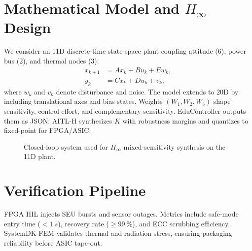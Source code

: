 \documentclass[conference]{IEEEtran}
\begin{document}
\section{Mathematical Model and \texorpdfstring{$H_\infty$}{H-infinity} Design}
We consider an 11D discrete-time state-space plant coupling attitude (6), power bus (2), and thermal nodes (3):
\begin{align}
  x_{k+1} &= A x_k + B u_k + E w_k, \label{eq:ss1}\\
  y_k     &= C x_k + D u_k + v_k, \label{eq:ss2}
\end{align}
where $w_k$ and $v_k$ denote disturbance and noise. The model extends to 20D by including translational axes and bias states.
Weights $(W_1,W_2,W_3)$ shape sensitivity, control effort, and complementary sensitivity. EduController outputs them as JSON; AITL-H synthesizes $K$ with robustness margins and quantizes to fixed-point for FPGA/ASIC.

\begin{figure}[!b]
\centering
{}
\caption{Closed-loop system used for $H_\infty$ mixed-sensitivity synthesis on the 11D plant.}
\label{fig:loop}
\end{figure}

\section{Verification Pipeline}
FPGA HIL injects SEU bursts and sensor outages. Metrics include safe-mode entry time ($<\SI{1}{s}$), recovery rate ($\ge\SI{99}{\percent}$), and ECC scrubbing efficiency. SystemDK FEM validates thermal and radiation stress, ensuring packaging reliability before ASIC tape-out.
\end{document}
